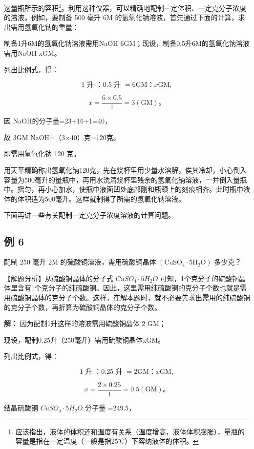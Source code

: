 这量瓶所示的容积\footnote{应该指出，液体的体积还和温度有关系（温度增高，液体体积膨胀），量瓶的容量是指在一定温度（一般是指25℃）下容纳液体的体积。}。利用这种仪器，可以精确地配制一定体积、一定克分子浓度的溶液。例如，要制备
500 毫升 6M 的氢氧化钠溶液，首先通过下面的计算，求出需用氢氧化钠的重量：

制备1升6M的氢氧化钠溶液需用NaOH
6GM；现设，制备0.5升6M的氢氧化钠溶液需用NaOH xGM。

列出比例式，得：

\[
1 \text{ 升 }\text{：} 0.5 \text{ 升 } = 6 \mathrm{GM}\text{：} x \mathrm{GM},
\]

\[
x = \frac {6 \times 0.5}{1} = 3 (\mathrm{GM})\text{。}
\]

因 NaOH的分子量=23+16+1=40，

故 3GM NaOH=（3×40）克=120克。

即需用氢氧化钠 120 克。

用天平精确称出氢氧化钠120克，先在烧杯里用少量水溶解，俟其冷却，小心倒入容量为500毫升的量瓶中，再用水洗清烧杯里残余的氢氧化钠溶液，一并倒入量瓶中。摇匀，再小心加水，使瓶中液面凹处底部刚和瓶颈上的刻痕相齐。此时瓶中液体的体积适为500毫升。这样就制得了所需的氢氧化钠溶液。

下面再讲一些有关配制一定克分子浓度溶液的计算问题。

\subsection{例 6}

配制 250 毫升 2M 的硫酸铜溶液，需用硫酸铜晶体
\(\left(\mathrm{CuSO}_{4} \cdot 5\mathrm{H}_{2}\mathrm{O}\right)\)
多少克？

【解题分析】从硫酸铜晶体的分子式 \(CuSO_{4}\cdot5H_{2}O\)
可知，1个克分子的硫酸铜晶体里含有1个克分子的纯硫酸铜。因此，这里需用纯硫酸铜的克分子个数也就是需用硫酸铜晶体的克分子个数。这样，在解本题时，就不必要先求出需用的纯硫酸铜的克分子个数，再折算为硫酸铜晶体的克分子个数。

\textbf{解：} 因为配制1升这样的溶液需用硫酸铜晶体 2 GM；

现设，配制0.25升（250毫升）需用硫酸铜晶体xGM。

列出比例式，得：

\[
1 \text{ 升 }\text{：} 0.25 \text{ 升 } = 2 \mathrm{GM}\text{：} x \mathrm{GM},
\]

\[
x = \frac {2 \times 0.25}{1} = 0.5 (\mathrm{GM})\text{。}
\]

结晶硫酸铜 \(CuSO_{4}\cdot5H_{2}O\) 分子量 =249.5，

